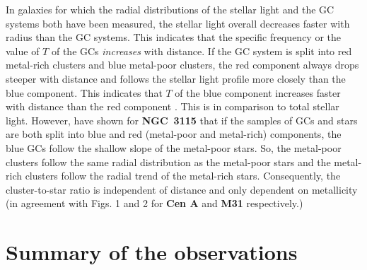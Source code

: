 \documentclass{aa}
\begin{document}
In galaxies for which the radial distributions of the stellar light and the GC systems both have been measured,
the stellar light overall decreases faster with radius than the GC systems. This indicates that the specific frequency or the value of
$T$ of the GCs {\it increases} with distance. If the GC system is split into red 
metal-rich clusters and blue metal-poor clusters, the red component always drops steeper with distance and 
follows the stellar light profile more closely than the blue component. This indicates that $T$ of the blue 
component increases faster with distance than the red component \citep{brodie06, pota13}. This
is in comparison to total stellar light. However, \citet{peacock15} have shown for {\bf NGC~3115} that if the 
samples of GCs and stars are both split into blue and red (metal-poor and metal-rich)
components, the blue GCs follow the shallow slope of the metal-poor stars.
So, the metal-poor clusters follow the same radial distribution as the metal-poor stars and 
the metal-rich clusters follow the radial trend of the metal-rich stars. Consequently, the cluster-to-star 
ratio is independent of distance and only dependent on metallicity (in agreement with Figs. 1 and 2 for 
{\bf Cen A} 
and {\bf M31} respectively.) 




\section{Summary of  the observations} \label{sec:obssum}
\end{document}
